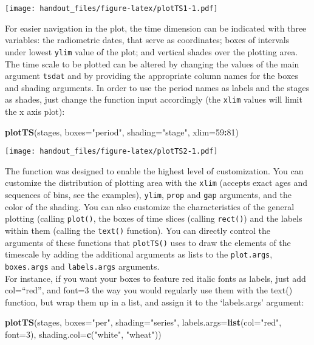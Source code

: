 \documentclass[]{article}
\newenvironment{Shaded}{\begin{snugshade}}{\end{snugshade}}
\newcommand{\DataTypeTok}[1]{\textcolor[rgb]{0.13,0.29,0.53}{#1}}
\newcommand{\DecValTok}[1]{\textcolor[rgb]{0.00,0.00,0.81}{#1}}
\newcommand{\KeywordTok}[1]{\textcolor[rgb]{0.13,0.29,0.53}{\textbf{#1}}}
\newcommand{\NormalTok}[1]{#1}
\newcommand{\OperatorTok}[1]{\textcolor[rgb]{0.81,0.36,0.00}{\textbf{#1}}}
\newcommand{\StringTok}[1]{\textcolor[rgb]{0.31,0.60,0.02}{#1}}
\begin{document}
\texttt{[image: handout\_files/figure-latex/plotTS1-1.pdf]}

For easier navigation in the plot, the time dimension can be indicated
with three variables: the radiometric dates, that serve as coordinates;
boxes of intervals under lowest \texttt{ylim} value of the plot; and
vertical shades over the plotting area. The time scale to be plotted can
be altered by changing the values of the main argument \texttt{tsdat}
and by providing the appropriate column names for the boxes and shading
arguments. In order to use the period names as labels and the stages as
shades, just change the function input accordingly (the \texttt{xlim}
values will limit the x axis plot):

\begin{Shaded}
\begin{Highlighting}[]
\KeywordTok{plotTS}\NormalTok{(stages, }\DataTypeTok{boxes=}\StringTok{"period"}\NormalTok{, }\DataTypeTok{shading=}\StringTok{"stage"}\NormalTok{, }\DataTypeTok{xlim=}\DecValTok{59}\OperatorTok{:}\DecValTok{81}\NormalTok{)}
\end{Highlighting}
\end{Shaded}

\texttt{[image: handout\_files/figure-latex/plotTS2-1.pdf]}

The function was designed to enable the highest level of customization.
You can customize the distribution of plotting area with the
\texttt{xlim} (accepts exact ages and sequences of bins, see the
examples), \texttt{ylim}, \texttt{prop} and \texttt{gap} arguments, and
the color of the shading. You can also customize the characteristics of
the general plotting (calling \texttt{plot()}, the boxes of time slices
(calling \texttt{rect()}) and the labels within them (calling the
\texttt{text()} function). You can directly control the arguments of
these functions that \texttt{plotTS()} uses to draw the elements of the
timescale by adding the additional arguments as lists to the
\texttt{plot.args}, \texttt{boxes.args} and \texttt{labels.args}
arguments.\\
For instance, if you want your boxes to feature red italic fonts as
labels, just add col=``red'', and font=3 the way you would regularly use
them with the text() function, but wrap them up in a list, and assign it
to the `labels.args' argument:

\begin{Shaded}
\begin{Highlighting}[]
\KeywordTok{plotTS}\NormalTok{(stages, }\DataTypeTok{boxes=}\StringTok{"per"}\NormalTok{, }\DataTypeTok{shading=}\StringTok{"series"}\NormalTok{, }
  \DataTypeTok{labels.args=}\KeywordTok{list}\NormalTok{(}\DataTypeTok{col=}\StringTok{"red"}\NormalTok{, }\DataTypeTok{font=}\DecValTok{3}\NormalTok{), }\DataTypeTok{shading.col=}\KeywordTok{c}\NormalTok{(}\StringTok{"white"}\NormalTok{, }\StringTok{"wheat"}\NormalTok{))}
\end{Highlighting}
\end{Shaded}
\end{document}
